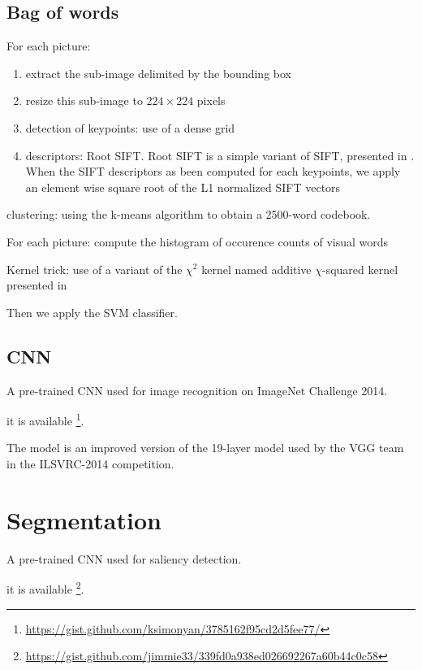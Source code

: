 \subsection{Bag of words}

For each picture:
\begin{enumerate}
    \item extract the sub-image delimited by the bounding box
    \item resize this sub-image to $224 \times 224$ pixels
    \item detection of keypoints: use of a dense grid
    \item descriptors: Root SIFT. Root SIFT is a simple variant of SIFT, presented in \cite{Arandjelovic2012}. When the SIFT descriptors as been computed for each keypoints, we apply an element wise square root of the L1 normalized SIFT vectors
\end{enumerate}

clustering: using the k-means algorithm to obtain a 2500-word codebook.

For each picture:
compute the histogram of occurence counts of visual words

Kernel trick: use of a variant of the $\chi^2$ kernel named additive $\chi$-squared kernel presented in \cite{Vedaldi2010}

Then we apply the SVM classifier.

\subsection{CNN}

A pre-trained CNN used for image recognition on ImageNet Challenge 2014.

\cite{Simonyan2014}

it is available \footnote{\url{https://gist.github.com/ksimonyan/3785162f95cd2d5fee77/}}.

The model is an improved version of the 19-layer model used by the VGG team in the ILSVRC-2014 competition.

\section{Segmentation}

A pre-trained CNN used for saliency detection.

\cite{zhang2015SOD}

it is available \footnote{\url{https://gist.github.com/jimmie33/339fd0a938ed026692267a60b44c0c58}}.

